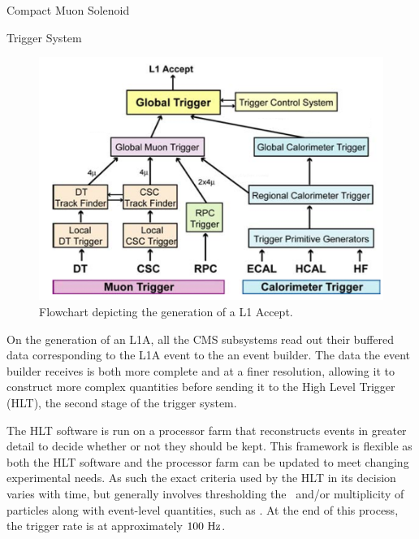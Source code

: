 \begin{section}{Compact Muon Solenoid}
\begin{subsection}{Trigger System}
\begin{figure}[tbp!]
\begin{center}
\includegraphics[angle=0,width=0.80\columnwidth]{fig/cms_trigger.png}
\end{center}
\caption{Flowchart depicting the generation of a L1 Accept.~\cite{1748-0221-3-08-S08004}}
\label{fig:cms_trigger}
\end{figure}

On the generation of an L1A, all the CMS subsystems read out their buffered data corresponding to the L1A event to the an event builder.
The data the event builder receives is both more complete and at a finer resolution, allowing it to construct more complex quantities before sending it to the High Level Trigger (HLT), the second stage of the trigger system.

The HLT software is run on a processor farm that reconstructs events in greater detail to decide whether or not they should be kept.
This framework is flexible as both the HLT software and the processor farm can be updated to meet changing experimental needs.
As such the exact criteria used by the HLT in its decision varies with time, but generally involves thresholding the \pT\ and/or multiplicity of particles along with event-level quantities, such as \HT.
At the end of this process, the trigger rate is at approximately $100~\mathrm{Hz}$.

\end{subsection}

\end{section}


